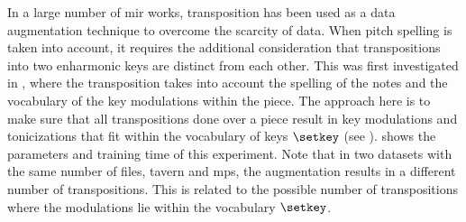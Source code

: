 
In a large number of \gls{mir} works, transposition has been
used as a data augmentation technique to overcome the
scarcity of data. When pitch spelling is taken into account,
it requires the additional consideration that transpositions
into two enharmonic keys are distinct from each other. This
was first investigated in \textcite{micchi2020not}, where
the transposition takes into account the spelling of the
notes and the vocabulary of the key modulations within the
piece. The approach here is to make sure that all
transpositions done over a piece result in key modulations
and tonicizations that fit within the vocabulary of keys
$\setkey$ (see ).
 shows the parameters and
training time of this experiment. Note that in two datasets
with the same number of files, \gls{tavern} and \gls{mps},
the augmentation results in a different number of
transpositions. This is related to the possible number of
transpositions where the modulations lie within the
vocabulary $\setkey$.

